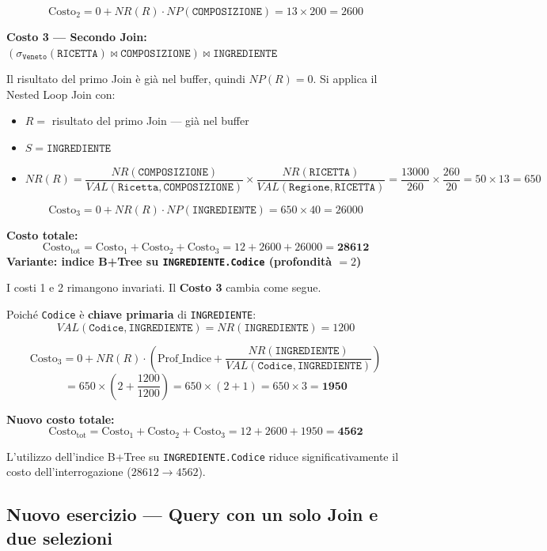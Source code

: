\[
\text{Costo}_2 = 0 + NR(R) \cdot NP(\texttt{COMPOSIZIONE}) = 13 \times 200 = 2600
\]

\bigskip
\noindent\textbf{Costo 3 — Secondo Join:} $(\sigma_{\texttt{Veneto}}(\texttt{RICETTA}) \bowtie \texttt{COMPOSIZIONE}) \bowtie \texttt{INGREDIENTE}$

\noindent Il risultato del primo Join è già nel buffer, quindi $NP(R) = 0$. Si applica il Nested Loop Join con:
\begin{itemize}
	\item $R = $ risultato del primo Join — già nel buffer
	\item $S = \texttt{INGREDIENTE}$
	\item $NR(R) = \dfrac{NR(\texttt{COMPOSIZIONE})}{VAL(\texttt{Ricetta}, \texttt{COMPOSIZIONE})} \times \dfrac{NR(\texttt{RICETTA})}{VAL(\texttt{Regione}, \texttt{RICETTA})} = \dfrac{13000}{260} \times \dfrac{260}{20} = 50 \times 13 = 650$
\end{itemize}

\[
\text{Costo}_3 = 0 + NR(R) \cdot NP(\texttt{INGREDIENTE}) = 650 \times 40 = 26000
\]

\bigskip
\noindent\textbf{Costo totale:}
\[
\text{Costo}_{\text{tot}} = \text{Costo}_1 + \text{Costo}_2 + \text{Costo}_3 = 12 + 2600 + 26000 = \mathbf{28612}
\]
\bigskip
\noindent\textbf{Variante: indice B+Tree su \texttt{INGREDIENTE.Codice} (profondità $= 2$)}

\bigskip
\noindent I costi 1 e 2 rimangono invariati. Il \textbf{Costo 3} cambia come segue.

\noindent Poiché \texttt{Codice} è \textbf{chiave primaria} di \texttt{INGREDIENTE}:
\[
VAL(\texttt{Codice}, \texttt{INGREDIENTE}) = NR(\texttt{INGREDIENTE}) = 1200
\]

\[
\text{Costo}_3 = 0 + NR(R) \cdot \left(\text{Prof\_Indice} +
\frac{NR(\texttt{INGREDIENTE})}{VAL(\texttt{Codice}, \texttt{INGREDIENTE})}\right)
\]
\[
= 650 \times \left(2 + \frac{1200}{1200}\right)
= 650 \times (2 + 1)
= 650 \times 3 = \mathbf{1950}
\]

\bigskip
\noindent\textbf{Nuovo costo totale:}
\[
\text{Costo}_{\text{tot}} = \text{Costo}_1 + \text{Costo}_2 + \text{Costo}_3
= 12 + 2600 + 1950 = \mathbf{4562}
\]

\noindent L'utilizzo dell'indice B+Tree su \texttt{INGREDIENTE.Codice} riduce significativamente il costo
dell'interrogazione ($28612 \rightarrow 4562$).
\bigskip
\subsection*{Nuovo esercizio — Query con un solo Join e due selezioni}

